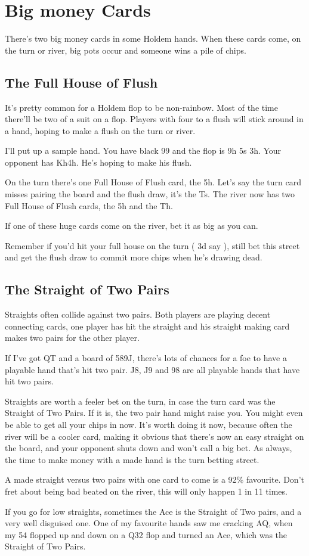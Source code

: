 \chapter{Big money Cards}


There's two big money cards in some Holdem hands. When these cards come,
on the turn or river, big pots occur and someone wins a pile of chips.

\section{The Full House of Flush}

It's pretty common for a Holdem flop to be non-rainbow. Most of the time
there'll be two of a suit on a flop. Players with four to a flush will
stick around in a hand, hoping to make a flush on the turn or river.

I'll put up a sample hand. You have black 99 and the flop is
9h 5s 3h. Your opponent has Kh4h. He's hoping to make his flush.

On the turn there's one Full House of Flush card, the 5h. Let's say
the turn card misses pairing the board and the flush draw, it's
the Ts. The river now has two Full House of Flush cards, the 5h and
the Th.

If one of these huge cards come on the river, bet it as big as you can.

Remember if you'd hit your full house on the turn ( 3d say ), still bet
this street and get the flush draw to commit more chips when he's drawing
dead.

\section{The Straight of Two Pairs}

Straights often collide against two pairs. Both players are playing
decent connecting cards, one player has hit the straight and his straight
making card makes two pairs for the other player.

If I've got QT and a board of 589J, there's lots of chances for a foe
to have a playable hand that's hit two pair. J8, J9 and 98 are all playable
hands that have hit two pairs.

Straights are worth a feeler bet on the turn, in case the turn card was
the Straight of Two Pairs. If it is, the two pair hand might raise
you. You might even be able to get all your chips
in now. It's worth doing it now, because often the river will be a cooler
card, making it obvious that there's now an easy straight on the board,
and your opponent shuts down and won't call a big bet. As always, the
time to make money with a made hand is the turn betting street.

A made straight versus two pairs with one card to come is a 92\% favourite.
Don't fret about being bad beated on the river, this will only happen
1 in 11 times.

If you go for low straights, sometimes the Ace is the Straight of Two pairs,
and a very well disguised one. One of my favourite hands saw me
cracking AQ, when my 54 flopped up and down on a Q32 flop and turned
an Ace, which was the Straight of Two Pairs.
